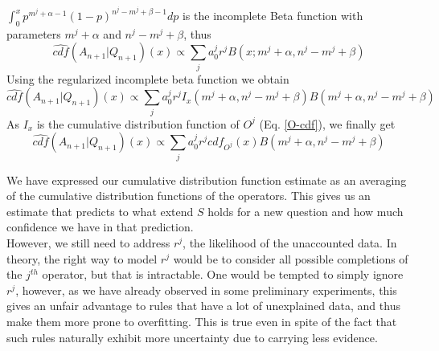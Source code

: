 \documentclass[runningheads]{llncs}
\begin{document}
$\displaystyle\int_0^x p^{m^j+\alpha - 1}(1-p)^{n^j-m^j+\beta - 1} dp$
is the incomplete Beta function with parameters $m^j+\alpha$ and
$n^j-m^j+\beta$, thus
\begin{equation}
  \label{betaconsol-3}
  \hat{cdf}(A_{n+1}|Q_{n+1})(x) \propto \sum_j a_0^j r^j
  B(x; m^j+\alpha, n^j-m^j+\beta)
\end{equation}
Using the regularized incomplete beta function we obtain
\begin{equation}
  \label{betaconsol-4}
  \hat{cdf}(A_{n+1}|Q_{n+1})(x) \propto \sum_j a_0^j r^j
  I_x(m^j+\alpha, n^j-m^j+\beta)
  B(m^j+\alpha, n^j-m^j+\beta)
\end{equation}
As $I_x$ is the cumulative distribution function of $O^j$
(Eq. \ref{O-cdf}), we finally get
\begin{equation}
  \label{betaconsol-final}
  \hat{cdf}(A_{n+1}|Q_{n+1})(x) \propto \sum_j a_0^j r^j cdf_{O^j}(x)
  B(m^j+\alpha, n^j-m^j+\beta)
\end{equation}

We have expressed our cumulative distribution function estimate as an
averaging of the cumulative distribution functions of the
operators. This gives us an estimate that predicts to what extend $S$
holds for a new question and how much confidence we have in that
prediction.\\

However, we still need to address $r^j$, the likelihood of the
unaccounted data. In theory, the right way to model $r^j$ would be to
consider all possible completions of the $j^{th}$ operator, but that
is intractable. One would be tempted to simply ignore $r^j$, however,
as we have already observed in some preliminary experiments, this
gives an unfair advantage to rules that have a lot of unexplained
data, and thus make them more prone to overfitting. This is true even
in spite of the fact that such rules naturally exhibit more
uncertainty due to carrying less evidence.
\end{document}
